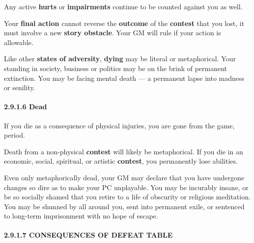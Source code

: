 \documentclass[
]{article}
\begin{document}
Any active \textbf{hurts} or \textbf{impairments} continue to be counted
against you as well.

Your \textbf{final action} cannot reverse the \textbf{outcome} of the
\textbf{contest} that you lost, it must involve a new \textbf{story
obstacle}. Your GM will rule if your action is allowable.

Like other \textbf{states of adversity}, \textbf{dying} may be literal
or metaphorical. Your standing in society, business or politics may be
on the brink of permanent extinction. You may be facing mental death ---
a permanent lapse into madness or senility.

\hypertarget{dead}{%
\paragraph{2.9.1.6 Dead}\label{dead}}

If you die as a consequence of physical injuries, you are gone from the
game, period.

Death from a non-physical \textbf{contest} will likely be metaphorical.
If you die in an economic, social, spiritual, or artistic
\textbf{contest}, you permanently lose abilities.

Even only metaphorically dead, your GM may declare that you have
undergone changes so dire as to make your PC unplayable. You may be
incurably insane, or be so socially shamed that you retire to a life of
obscurity or religious meditation. You may be shunned by all around you,
sent into permanent exile, or sentenced to long-term imprisonment with
no hope of escape.

\hypertarget{consequences-of-defeat-table}{%
\paragraph{2.9.1.7 CONSEQUENCES OF DEFEAT
TABLE}\label{consequences-of-defeat-table}}
\end{document}
